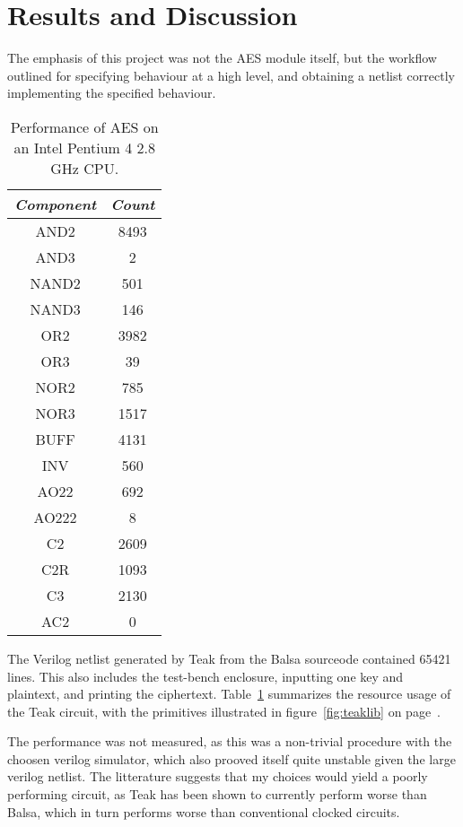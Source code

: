\section{Results and Discussion}

The emphasis of this project was not the AES module itself, but the
workflow outlined for specifying behaviour at a high level, and
obtaining a netlist correctly implementing the specified
behaviour.

\begin{table}[h]
  \centering
  \begin{tabular}{|c|c|}
    \hline
    \emph{Component}  & \emph{Count} \\ \hline
    AND2 & 8493 \\
    AND3 & 2 \\
    NAND2 & 501 \\
    NAND3 & 146 \\
    OR2 & 3982 \\
    OR3 & 39 \\
    NOR2 & 785 \\ 
    NOR3 & 1517 \\
    BUFF & 4131 \\
    INV & 560 \\
    AO22 & 692 \\
    AO222 & 8 \\
    C2 & 2609 \\
    C2R & 1093 \\
    C3  & 2130 \\
    AC2 & 0
  \end{tabular}
  \caption{Performance of AES on an Intel Pentium 4 2.8 GHz CPU.}
  \label{tab:res}
\end{table}

The Verilog netlist generated by Teak from the Balsa sourceode
contained 65421 lines. This also includes the test-bench enclosure,
inputting one key and plaintext, and printing the
ciphertext. Table~\ref{tab:res} summarizes the resource usage of the
Teak circuit, with the primitives illustrated in
figure~\ref{fig:teaklib} on page~\pageref{fig:teaklib}.

The performance was not measured, as this was a non-trivial procedure
with the choosen verilog simulator, which also prooved itself quite
unstable given the large verilog netlist. The litterature suggests
that my choices would yield a poorly performing circuit, as Teak has
been shown to currently perform worse than Balsa, which in turn
performs worse than conventional clocked circuits.


